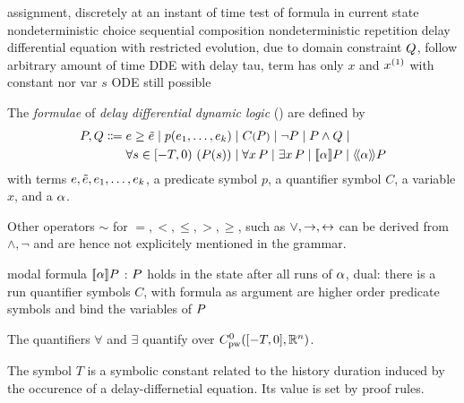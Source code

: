     assignment, discretely at an instant of time
    test of formula in current state
    nondeterministic choice
    sequential composition
    nondeterministic repetition
    delay differential equation with restricted evolution, due to domain constraint $Q$, follow arbitrary amount of time
    DDE with delay tau, term has only $x$ and $\D{x}$ with constant nor var $s$
    ODE still possible


    \begin{definition}\label{def:syntax-formula}
        The \emph{formulae} of \emph{delay differential dynamic logic} (\ddL) are defined by
        \begin{align*}
            \asfml,\bsfml \Coloneqq{}& %
                \astrm\geq\bstrm \mid
                p(\range{\istrm{1}}{\istrm{k}}) \mid
                \contextapp{C}{\asfml} \mid
                \lnot\asfml \mid
                \asfml\land\bsfml \mid\\
                &\holdssince{T}{\asfml(s)} \mid
                \lforall{x}{\asfml} \mid
                \lexists{x}{\asfml} \mid
                \dbox{\asprg}{\asfml} \mid
                \ddiamond{\asprg}{\asfml}
        \end{align*}
        with \ddL terms $e,\tilde{e},e_{1},\ldots,e_{k}$,
        a predicate symbol $p$, a quantifier symbol $C$, a variable $x$, and a \dHP $\alpha$.
        
        Other operators
        $\sim$ for $=,<,\leq,>,\geq$, such as $\lor,\rightarrow,\leftrightarrow$ can be derived from $\land,\lnot$ and are hence not explicitely mentioned in the grammar.

        modal formula $\dbox{\asprg}{\asfml}$ : $P$ holds in the state after all runs of $\alpha$, dual: there is a run
        quantifier symbols $C$, with formula as argument are higher order predicate symbols and bind the variables of $P$

        The quantifiers $\forall$ and $\exists$ quantify over $\statespace$.

        The symbol $T$ is a symbolic constant related to the history duration induced by the occurence of a delay-differnetial equation. Its value is set by proof rules.
    \end{definition}

